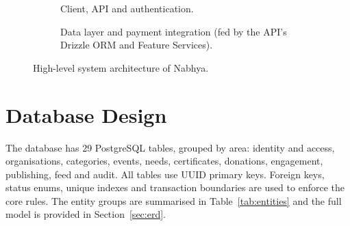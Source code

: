 \begin{figure}[H]
    \centering
    \begin{subfigure}[t]{\textwidth}
        \centering
        \caption{Client, API and authentication.}
    \end{subfigure}
    \par\vspace{0.2in}
    \begin{subfigure}[t]{\textwidth}
        \centering
        \caption{Data layer and payment integration (fed by the API's Drizzle ORM and Feature Services).}
    \end{subfigure}
    \caption{High-level system architecture of Nabhya.}
    \label{fig:architecture}
\end{figure}

\section{Database Design}
The database has 29 PostgreSQL tables, grouped by area: identity and access, organisations, categories, events, needs, certificates, donations, engagement, publishing, feed and audit. All tables use UUID primary keys. Foreign keys, status enums, unique indexes and transaction boundaries are used to enforce the core rules. The entity groups are summarised in Table~\ref{tab:entities} and the full model is provided in Section~\ref{sec:erd}.

